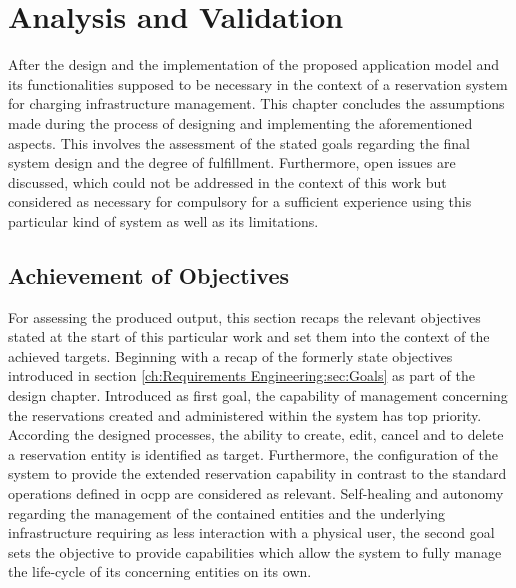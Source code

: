 
\chapter{Analysis and Validation}
\label{ch:Analysis and Validation}

After the design and the implementation of the proposed application model and its functionalities supposed to be necessary in the context of a reservation system for charging infrastructure management. This chapter concludes the assumptions made during the process of designing and implementing the aforementioned aspects.
This involves the assessment of the stated goals regarding the final system design and the degree of fulfillment.
Furthermore, open issues are discussed, which could not be addressed in the context of this work but considered as necessary for compulsory for a sufficient experience using this particular kind of system as well as its limitations.

\section{Achievement of Objectives}
\label{ch:Analysis and Validation:sec:Achievement of Objectives}

For assessing the produced output, this section recaps the relevant objectives stated at the start of this particular work and set them into the context of the achieved targets.
Beginning with a recap of the formerly state objectives introduced in section \ref{ch:Requirements Engineering:sec:Goals} as part of the design chapter.
Introduced as first goal, the capability of management concerning the reservations created and administered within the system has top priority. According the designed processes, the ability to create, edit, cancel and to delete a reservation entity is identified as target.
Furthermore, the configuration of the system to provide the extended reservation capability in contrast to the standard operations defined in \acrshort{ocpp} are considered as relevant.
Self-healing and autonomy regarding the management of the contained entities and the underlying infrastructure requiring as less interaction with a physical user, the second goal sets the objective to provide capabilities which allow the system to fully manage the life-cycle of its concerning entities on its own.

